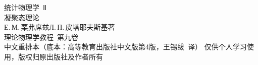 \documentclass[11pt,a4paper,twoside,openright]{ctexbook}
\numberwithin{equation}{section}
\begin{document}
\begin{titlepage}
\thispagestyle{empty}
\centering
\vspace*{3.2cm}
{\heiti 统计物理学\ Ⅱ}\\[0.8em]
{\heiti 凝聚态理论}\\[1.2em]
{\kaishu Е.\,М.\,栗弗席兹\quad Л.\,П.\,皮塔耶夫斯基\quad 著}\\[3em]
{\kaishu 理论物理学教程\ 第九卷}\\[2em]
{\kaishu 中文重排本（底本：高等教育出版社中文版第4版，王锡绂\ 译）}
\vfill
{\kaishu 仅供个人学习使用，版权归原出版社及作者所有}
\end{titlepage}



{\hypersetup{linktoc=all}\tableofcontents}
\clearpage















\end{document}
